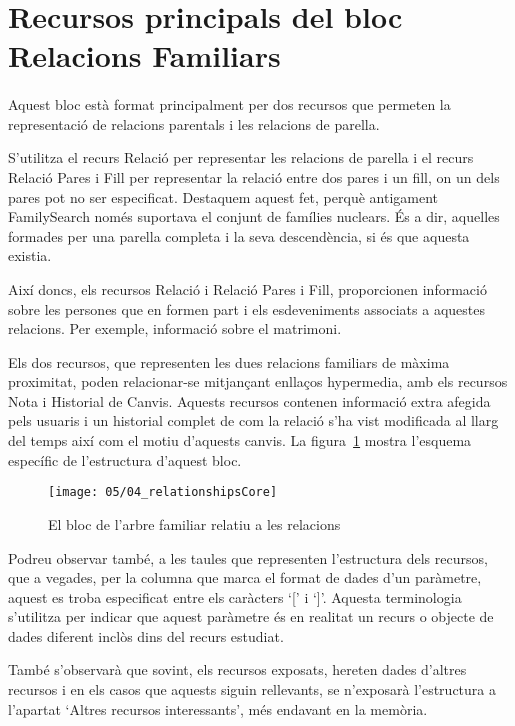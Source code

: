 \section{Recursos principals del bloc Relacions Familiars}

    \paragraph{}
    Aquest bloc està format principalment per dos recursos que permeten la representació de relacions parentals i les relacions de parella.

    S'utilitza el recurs Relació per representar les relacions de parella i el recurs Relació Pares i Fill per representar la relació entre dos pares i un fill, on un dels pares pot no ser especificat. Destaquem aquest fet, perquè antigament FamilySearch només suportava el conjunt de famílies nuclears. És a dir, aquelles formades per una parella completa i la seva descendència, si és que aquesta existia.

    Així doncs, els recursos Relació i Relació Pares i Fill, proporcionen informació sobre les persones que en formen part i els esdeveniments associats a aquestes relacions. Per exemple, informació sobre el matrimoni.

    Els dos recursos, que representen les dues relacions familiars de màxima proximitat, poden relacionar-se mitjançant enllaços hypermedia, amb els recursos Nota i Historial de Canvis. Aquests recursos contenen informació extra afegida pels usuaris i un historial complet de com la relació s'ha vist modificada al llarg del temps així com el motiu d'aquests canvis. La figura~\ref{img:relationshipsBloc} mostra l'esquema específic de l'estructura d'aquest bloc.

    \begin{figure}[h]
        \texttt{[image: 05/04\_relationshipsCore]}
        \centering
        \caption{El bloc de l'arbre familiar relatiu a les relacions}\label{img:relationshipsBloc}
    \end{figure}

    Podreu observar també, a les taules que representen l'estructura dels recursos, que a vegades, per la columna que marca el format de dades d'un paràmetre, aquest es troba especificat entre els caràcters `[' i `]'. Aquesta terminologia s'utilitza per indicar que aquest paràmetre és en realitat un recurs o objecte de dades diferent inclòs dins del recurs estudiat.

    També s'observarà que sovint, els recursos exposats, hereten dades d'altres recursos i en els casos que aquests siguin rellevants, se n'exposarà l'estructura a l'apartat `Altres recursos interessants', més endavant en la memòria.

    
    
